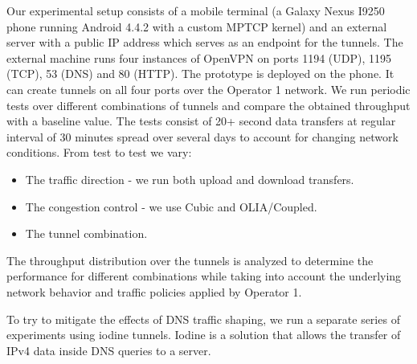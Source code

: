 Our experimental setup consists of a mobile terminal (a Galaxy Nexus I9250 phone running Android 4.4.2 with a custom MPTCP kernel) and an external server with a public IP address which serves as an endpoint for the tunnels. The external machine runs four instances of OpenVPN on ports 1194 (UDP), 1195 (TCP), 53 (DNS) and 80 (HTTP). The prototype is deployed on the phone. It can create tunnels on all four ports over the Operator 1 network. We run periodic tests over different combinations of tunnels and compare the obtained throughput with a baseline value. The tests consist of 20+ second data transfers at regular interval of 30 minutes spread over several days to account for changing network conditions. From test to test we vary:

\begin{itemize}
\item The traffic direction - we run both upload and download transfers.
\item The congestion control - we use Cubic and OLIA/Coupled.
\item The tunnel combination.
\end{itemize}

The throughput distribution over the tunnels is analyzed to determine the performance for different combinations while taking into account the underlying network behavior and traffic policies applied by Operator 1.

To try to mitigate the effects of DNS traffic shaping, we run a separate series of experiments using iodine tunnels. Iodine is a solution that allows the transfer of IPv4 data inside DNS queries to a server.
